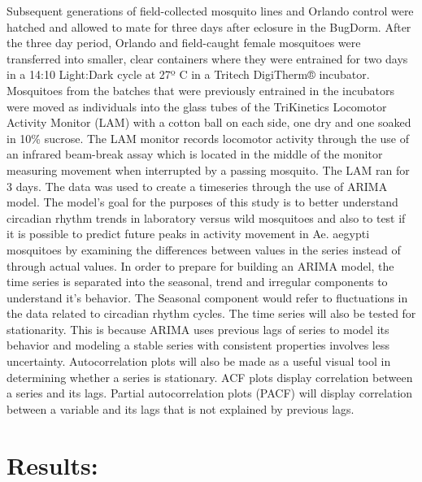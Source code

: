 \documentclass[]{article}
\begin{document}
Subsequent generations of field-collected mosquito lines and Orlando
control were hatched and allowed to mate for three days after eclosure
in the BugDorm. After the three day period, Orlando and field-caught
female mosquitoes were transferred into smaller, clear containers where
they were entrained for two days in a 14:10 Light:Dark cycle at 27º C in
a Tritech DigiTherm® incubator. Mosquitoes from the batches that were
previously entrained in the incubators were moved as individuals into
the glass tubes of the TriKinetics Locomotor Activity Monitor (LAM) with
a cotton ball on each side, one dry and one soaked in 10\% sucrose. The
LAM monitor records locomotor activity through the use of an infrared
beam-break assay which is located in the middle of the monitor measuring
movement when interrupted by a passing mosquito. The LAM ran for 3 days.
The data was used to create a timeseries through the use of ARIMA model.
The model's goal for the purposes of this study is to better understand
circadian rhythm trends in laboratory versus wild mosquitoes and also to
test if it is possible to predict future peaks in activity movement in
Ae. aegypti mosquitoes by examining the differences between values in
the series instead of through actual values. In order to prepare for
building an ARIMA model, the time series is separated into the seasonal,
trend and irregular components to understand it's behavior. The Seasonal
component would refer to fluctuations in the data related to circadian
rhythm cycles. The time series will also be tested for stationarity.
This is because ARIMA uses previous lags of series to model its behavior
and modeling a stable series with consistent properties involves less
uncertainty. Autocorrelation plots will also be made as a useful visual
tool in determining whether a series is stationary. ACF plots display
correlation between a series and its lags. Partial autocorrelation plots
(PACF) will display correlation between a variable and its lags that is
not explained by previous lags.

\hypertarget{results}{%
\section{Results:}\label{results}}
\end{document}
